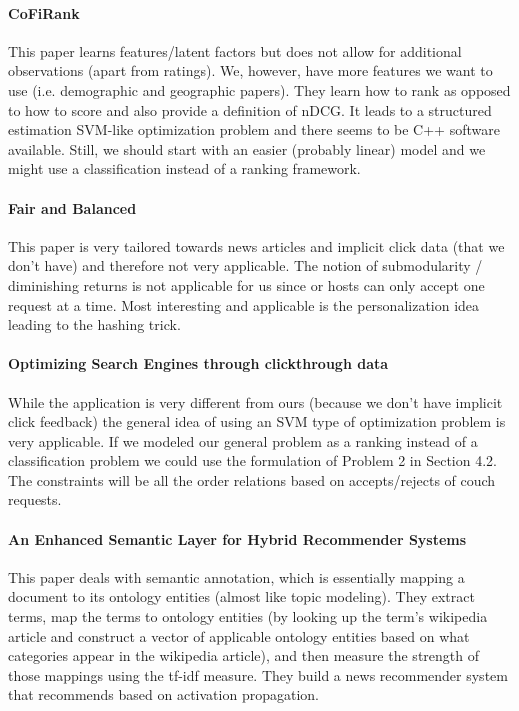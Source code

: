 \documentclass[11pt]{article}
\begin{document}
\paragraph{CoFiRank} \cite{Weimer2009}
This paper learns features/latent factors but does not allow for additional observations (apart from ratings). We, however, have more features we want to use (i.e. demographic and geographic papers). They learn how to rank as opposed to how to score and also provide a definition of nDCG. It leads to a structured estimation SVM-like optimization problem and there seems to be C++ software available. Still, we should start with an easier (probably linear) model and we might use a classification instead of a ranking framework.

\paragraph{Fair and Balanced} \cite{Ahmed2012}
This paper is very tailored towards news articles and implicit click data (that we don't have) and therefore not very applicable. The notion of submodularity / diminishing returns is not applicable for us since or hosts can only accept one request at a time. Most interesting and applicable is the personalization idea leading to the hashing trick.

\paragraph{Optimizing Search Engines through clickthrough data} \cite{Joachims2002}
While the application is very different from ours (because we don't have implicit click feedback) the general idea of using an SVM type of optimization problem is very applicable. If we modeled our general problem as a ranking instead of a classification problem we could use the formulation of Problem 2 in Section 4.2. The constraints will be all the order relations based on accepts/rejects of couch requests.

\paragraph{An Enhanced Semantic Layer for Hybrid Recommender Systems} \cite{Cantador2011}
This paper deals with semantic annotation, which is essentially mapping a document to its ontology entities (almost like topic modeling). They extract terms, map the terms to ontology entities (by looking up the term's wikipedia article and construct a vector of applicable ontology entities based on what categories appear in the wikipedia article), and then measure the strength of those mappings using the tf-idf measure.
They build a news recommender system that recommends based on activation propagation.
\end{document}
